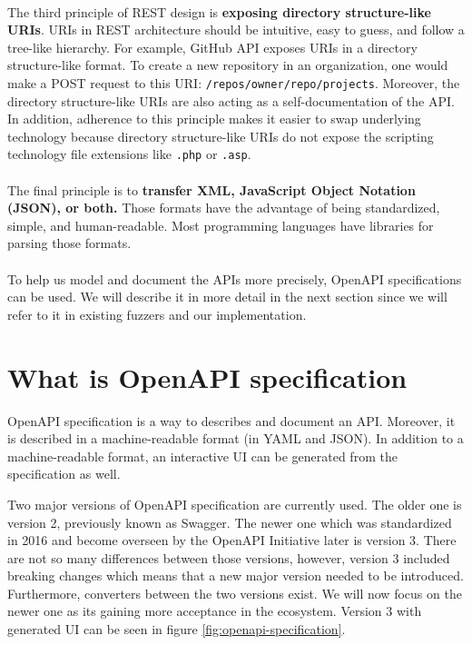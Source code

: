 \paragraph{}
The third principle of REST design is \textbf{exposing directory structure-like URIs}. URIs in REST architecture should be intuitive, easy to guess, and follow a tree-like hierarchy. For example, GitHub API exposes URIs in a directory structure-like format. To create a new repository in an organization, one would make a POST request to this URI: \texttt{/repos/{owner}/{repo}/projects}. Moreover, the directory structure-like URIs are also acting as a self-documentation of the API. In addition, adherence to this principle makes it easier to swap underlying technology because directory structure-like URIs do not expose the scripting technology file extensions like \texttt{.php} or \texttt{.asp}.

\paragraph{}
The final principle is to \textbf{transfer XML, JavaScript Object Notation (JSON), or both.} Those formats have the advantage of being standardized, simple, and human-readable. Most programming languages have libraries for parsing those formats.

\paragraph{}
To help us model and document the APIs more precisely, OpenAPI specifications can be used. We will describe it in more detail in the next section since we will refer to it in existing fuzzers and our implementation.


\section{What is OpenAPI specification}
\label{sec:openapi}
OpenAPI specification is a way to describes and document an API. Moreover, it is described in a  machine-readable format (in YAML \cite{ben2009yaml} and JSON). In addition to a machine-readable format, an interactive UI can be generated from the specification as well.

Two major versions of OpenAPI specification are currently used. The older one is version 2, previously known as Swagger. The newer one which was standardized in 2016 and become overseen by the OpenAPI Initiative \cite{openapi2020main} later is version 3. There are not so many differences between those versions, however, version 3 included breaking changes which means that a new major version needed to be introduced. Furthermore, converters between the two versions exist. We will now focus on the newer one as its gaining more acceptance in the ecosystem. Version 3 with generated UI can be seen in figure \ref{fig:openapi-specification}.

